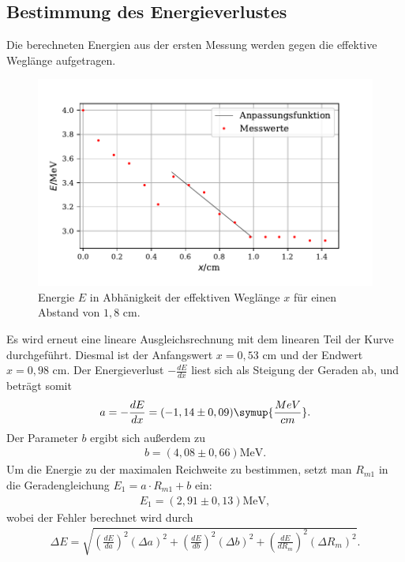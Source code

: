 \subsection{Bestimmung des Energieverlustes}
Die berechneten Energien aus der ersten Messung werden gegen die effektive Weglänge aufgetragen. 
\begin{figure}[H]
  \centering
  \includegraphics{plot3.pdf}
  \caption{Energie $E$ in Abhänigkeit der effektiven Weglänge $x$ für einen Abstand von $1,8$ $\si{\cm}$. }
  \label{fig:plot}
\end{figure}
\noindent Es wird erneut eine lineare Ausgleichsrechnung mit dem linearen Teil der Kurve durchgeführt. Diesmal ist der Anfangswert $x=0,53$ $\si{\cm}$ und der Endwert $x=0,98$ $\si{\cm}$.  Der Energieverlust $-\frac{dE}{dx}$
liest sich als Steigung der Geraden ab, und beträgt somit
\begin{align*}
a = -\frac{dE}{dx} = (-1,14 \pm 0,09) \symup{\frac{MeV}{cm}} .
\end{align*}
Der Parameter $b$ ergibt sich außerdem zu
\begin{align*}
b = (4,08 \pm 0,66) \si{\MeV}.
\end{align*}
Um die Energie zu der maximalen Reichweite zu bestimmen, setzt man $R_{m1}$ in die Geradengleichung $E_1 = a \cdot R_{m1} + b$ ein:
\begin{align*}
E_1 = (2,91 \pm 0,13) \si{\MeV}, %
\end{align*}
wobei der Fehler berechnet wird durch
\begin{align*}
\Delta E = \sqrt{(\frac{dE}{da})^2 (\Delta a)^2 + (\frac{dE}{db})^2 (\Delta b)^2 + (\frac{dE}{dR_m})^2 (\Delta R_m)^2}.
\end{align*}


